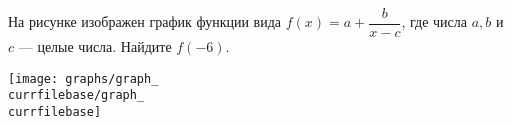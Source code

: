 \begin{ex}
	\begin{condition}
		\begin{minipage}[t]{0.67\textwidth}
			На рисунке изображен график функции вида \( f(x)=a+\dfrac{b}{x-c} \), где числа \( a, b \) и \( c \) --- целые числа. Найдите \( f(-6) \).
		\end{minipage}
		\begin{minipage}[c]{0.25\textwidth}
			\texttt{[image: graphs/graph\_\\currfilebase/graph\_\\currfilebase]}
		\end{minipage}
	\end{condition}
\end{ex}